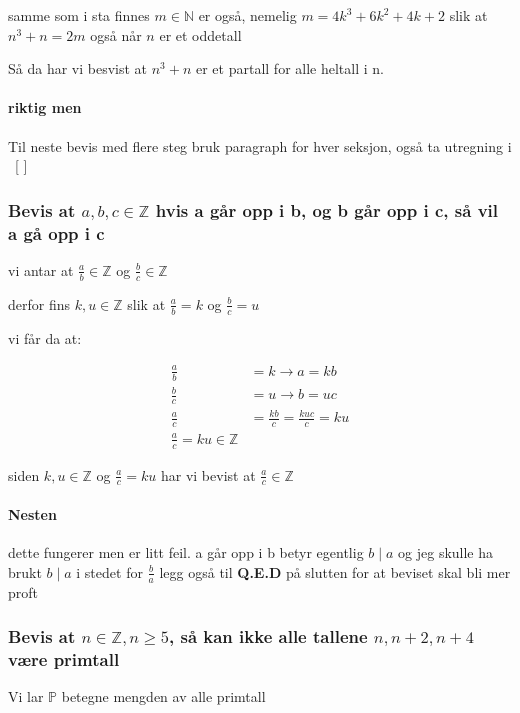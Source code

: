 \documentclass{article}
\begin{document}
samme som i sta finnes $m \in \mathbb{N}$ er også, nemelig $m=4k^3+6k^2+4k+2$ slik at $n^3+n=2m$ også når $n$ er et oddetall

Så da har vi besvist at $n^3+n$ er et partall for alle heltall i n.

\paragraph{riktig men}

Til neste bevis med flere steg bruk paragraph for hver seksjon, også ta utregning i \ [ ] \

\subsubsection{Bevis at $a,b,c \in \mathbb{Z}$ hvis a går opp i b, og b går opp i c, så vil a gå opp i c }

vi antar at $\frac{a}{b} \in \mathbb{Z}$ og $\frac{b}{c} \in \mathbb{Z}$

derfor fins $k, u \in \mathbb{Z}$ slik at $\frac{a}{b}=k$ og $\frac{b}{c}=u$

vi får da at:

\begin{align*}
    \frac{a}{b} &= k \rightarrow a = kb \\
    \frac{b}{c} &= u \rightarrow b = uc \\
    \frac{a}{c} &= \frac{kb}{c} = \frac{kuc}{c}=ku \\
    \frac{a}{c}=ku \in \mathbb{Z}
\end{align*}

siden $k,u \in \mathbb{Z}$ og $\frac{a}{c}=ku$ har vi bevist at $\frac{a}{c} \in \mathbb{Z}$

\paragraph{Nesten}

dette fungerer men er litt feil. a går opp i b betyr egentlig $b \mid a$
og jeg skulle ha brukt $b \mid a$ i stedet for $\frac{b}{a}$
legg også til \textbf{Q.E.D} på slutten for at beviset skal bli mer proft

\subsubsection{Bevis at $n \in \mathbb{Z}, n \geq 5$, så kan ikke alle tallene $n, n+2, n+4$ være primtall}

Vi lar $\mathbb{P}$ betegne mengden av alle primtall
\end{document}
